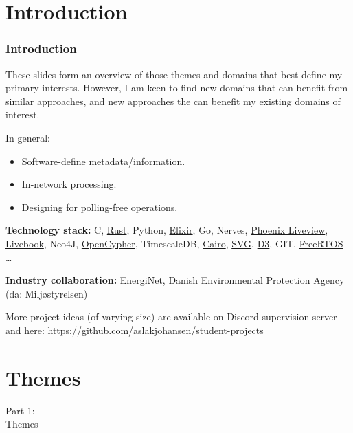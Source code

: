 \section{Introduction}
\begin{frame}
  \frametitle{Introduction}
  \vspace{0mm}
  These slides form an overview of those themes and domains that best define my primary interests. However, I am keen to find new domains that can benefit from similar approaches, and new approaches the can benefit my existing domains of interest.
  
  \vspace{2mm}
  In general:
  \begin{itemize}
    \item Software-define metadata/information.
    \item In-network processing.
    \item Designing for polling-free operations.
  \end{itemize}
  
  \vspace{2mm}
  \textbf{Technology stack:} C, \href{https://www.youtube.com/watch?v=5C_HPTJg5ek}{Rust}, Python, \href{https://www.youtube.com/watch?v=R7t7zca8SyM}{Elixir}, Go, Nerves, \href{https://www.youtube.com/watch?v=U_Pe8Ru06fM}{Phoenix Liveview}, \href{https://livebook.dev/}{Livebook}, Neo4J, \href{https://opencypher.org}{OpenCypher}, TimescaleDB, \href{https://www.cairographics.org}{Cairo}, \href{https://en.wikipedia.org/wiki/SVG}{SVG}, \href{https://d3js.org}{D3}, GIT, \href{https://www.freertos.org}{FreeRTOS} \ldots
  
  \vspace{2mm}
  \textbf{Industry collaboration:} EnergiNet, Danish Environmental Protection Agency (da: Miljøstyrelsen)
  
  \vspace{2mm}
  More project ideas (of varying size) are available on Discord supervision server and here: \url{https://github.com/aslakjohansen/student-projects}
\end{frame}

\section{Themes}
\begin{frame}
  \vspace{25mm}
  \begin{center}
    \Huge{Part 1:\\Themes}
  \end{center}
\end{frame}

